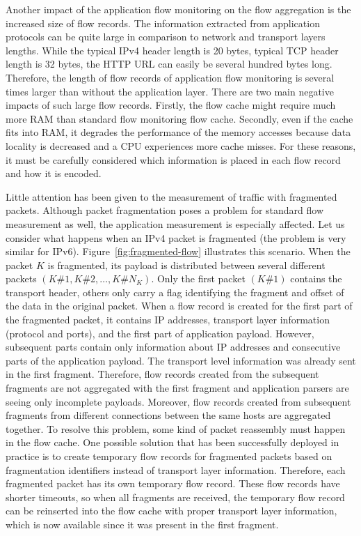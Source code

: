 Another impact of the application flow monitoring on the flow aggregation is the increased size of flow records. The information extracted from application protocols can be quite large in comparison to network and transport layers lengths. While the typical IPv4 header length is 20 bytes, typical TCP header length is 32 bytes, the HTTP URL can easily be several hundred bytes long. Therefore, the length of flow records of application flow monitoring is several times larger than without the application layer. There are two main negative impacts of such large flow records. Firstly, the flow cache might require much more RAM than standard flow monitoring flow cache. Secondly, even if the cache fits into RAM, it degrades the performance of the memory accesses because data locality is decreased and a CPU experiences more cache misses. For these reasons, it must be carefully considered which information is placed in each flow record and how it is encoded.

Little attention has been given to the measurement of traffic with fragmented packets. Although packet fragmentation poses a problem for standard flow measurement as well, the application measurement is especially affected. Let us consider what happens when an IPv4 packet is fragmented (the problem is very similar for IPv6). Figure~\ref{fig:fragmented-flow} illustrates this scenario. When the packet $K$ is fragmented, its payload is distributed between several different packets $(K\#1, K\#2, \ldots, K\#N_K)$. Only the first packet $(K\#1)$ contains the transport header, others only carry a flag identifying the fragment and offset of the data in the original packet. When a flow record is created for the first part of the fragmented packet, it contains IP addresses, transport layer information (protocol and ports), and the first part of application payload. However, subsequent parts contain only information about IP addresses and consecutive parts of the application payload. The transport level information was already sent in the first fragment. Therefore, flow records created from the subsequent fragments are not aggregated with the first fragment and application parsers are seeing only incomplete payloads. Moreover, flow records created from subsequent fragments from different connections between the same hosts are aggregated together. To resolve this problem, some kind of packet reassembly must happen in the flow cache. One possible solution that has been successfully deployed in practice is to create temporary flow records for fragmented packets based on fragmentation identifiers instead of transport layer information. Therefore, each fragmented packet has its own temporary flow record. These flow records have shorter timeouts, so when all fragments are received, the temporary flow record can be reinserted into the flow cache with proper transport layer information, which is now available since it was present in the first fragment.

